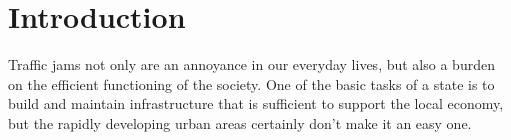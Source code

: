 \documentclass[english, 12pt, a4paper, elec, utf8, pdfa, online]{aaltothesis}
\begin{document}




\cleardoublepage

\section{Introduction}
	
\thispagestyle{empty}

Traffic jams not only are an annoyance in our everyday lives, but also a burden on the efficient functioning of the society. One of the basic tasks of a state is to build and maintain infrastructure that is sufficient to support the local economy, but the rapidly developing urban areas certainly don't make it an easy one.
\end{document}
